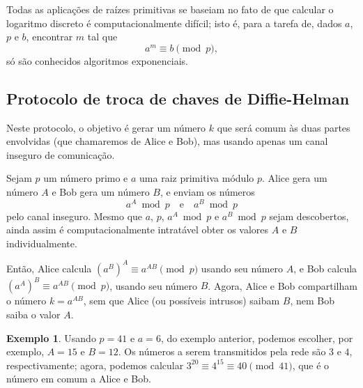 \documentclass{article}
\theoremstyle{definition}
\newtheorem{example}{Exemplo}
\begin{document}
Todas as aplicações de raízes primitivas
se baseiam no fato de que calcular o logaritmo discreto
é computacionalmente difícil;
isto é, para a tarefa de,
dados $a$, $p$ e $b$,
encontrar $m$ tal que
\begin{equation*}
    a^m \equiv b \pmod p,
\end{equation*}
só são conhecidos algoritmos exponenciais.

\subsection{Protocolo de troca de chaves de Diffie-Helman}

Neste protocolo,
o objetivo é gerar um número $k$ que será comum às duas partes envolvidas
(que chamaremos de Alice e Bob),
mas usando apenas um canal inseguro de comunicação.

Sejam $p$ um número primo e $a$ uma raiz primitiva módulo $p$.
Alice gera um número $A$ e Bob gera um número $B$,
e enviam os números
\begin{equation*}
    a^A \bmod p \quad \text{e} \quad a^B \bmod p
\end{equation*}
pelo canal inseguro.
Mesmo que $a$, $p$, $a^A \bmod p$ e $a^B \bmod p$ sejam descobertos,
ainda assim é computacionalmente intratável
obter os valores $A$ e $B$ individualmente.

Então, Alice calcula $(a^B)^A \equiv a^{AB} \pmod p$
usando seu número $A$,
e Bob calcula $(a^A)^B \equiv a^{AB} \pmod p$,
usando seu número $B$.
Agora,
Alice e Bob compartilham o número $k = a^{AB}$,
sem que Alice (ou possíveis intrusos) saibam $B$,
nem Bob saiba o valor $A$.

\begin{example}
    Usando $p = 41$ e $a = 6$,
    do exemplo anterior,
    podemos escolher, por exemplo, $A = 15$ e $B = 12$.
    Os números a serem transmitidos pela rede
    são $3$ e $4$,
    respectivamente;
    agora,
    podemos calcular $3^{20} \equiv 4^{15} \equiv 40 \pmod{41}$,
    que é o número em comum a Alice e Bob.
\end{example}



\end{document}
